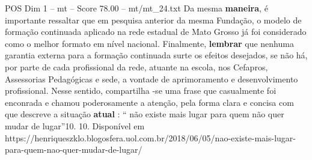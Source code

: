 \begin{textsample}{POS Dim 1 – mt – Score 78.00 – mt/mt\_24.txt}
Da mesma \textbf{maneira}, é importante ressaltar que em pesquisa anterior da mesma Fundação, o modelo de formação continuada aplicado na rede estadual de Mato Grosso já foi considerado como o melhor formato em nível nacional.
Finalmente, \textbf{lembrar} que nenhuma garantia externa para a formação continuada surte os efeitos desejados, se não há, por parte de cada profissional da rede, atuante na escola, nos Cefapros, Assessorias Pedagógicas e sede, a vontade de aprimoramento e desenvolvimento profissional.
Nesse sentido, compartilha -se uma frase que casualmente foi enconrada e chamou poderosamente a atenção, pela forma clara e concisa com que descreve a situação \textbf{atual} : “ não existe mais lugar para quem não quer mudar de lugar”10. 10.
Disponível em https://henriqueszklo.blogosfera.uol.com.br/2018/06/05/nao-existe-mais-lugar-para-quem-nao-quer-mudar-de-lugar/

\end{textsample}
